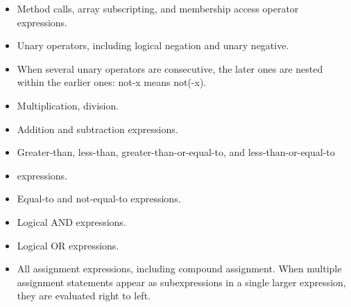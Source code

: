 \begin{homeworkProblem}
	\begin{itemize}
		\item Method calls, array subscripting, and membership access operator expressions.
		\item Unary operators, including logical negation and unary negative.
		\item When several unary operators are consecutive, the later ones are nested within the earlier ones: not-x means not(-x).
		\item Multiplication, division.
		\item Addition and subtraction expressions.
		\item Greater-than, less-than, greater-than-or-equal-to, and less-than-or-equal-to
		\item expressions.
		\item Equal-to and not-equal-to expressions.
		\item Logical AND expressions.
		\item Logical OR expressions.
		\item All assignment expressions, including compound assignment. When multiple assignment statements appear as subexpressions in a single larger expression, they are evaluated right to left.
	\end{itemize}

	
\end{homeworkProblem}
